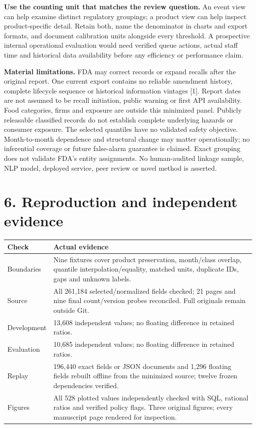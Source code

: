 \documentclass[10pt,letterpaper]{article}
\begin{document}
\textbf{Use the counting unit that matches the review question.} An event view can help examine distinct regulatory groupings; a product view can help inspect product-specific detail. Retain both, name the denominator in charts and export formats, and document calibration units alongside every threshold. A prospective internal operational evaluation would need verified queue actions, actual staff time and historical data availability before any efficiency or performance claim.

\textbf{Material limitations.} FDA may correct records or expand recalls after the original report. One current export contains no reliable amendment history, complete lifecycle sequence or historical information vintages [1]. Report dates are not assumed to be recall initiation, public warning or first API availability. Food categories, firms and exposure are outside this minimized panel. Publicly releasable classified records do not establish complete underlying hazards or consumer exposure. The selected quantiles have no validated safety objective. Month-to-month dependence and structural change may matter operationally; no inferential coverage or future false-alarm guarantee is claimed. Exact grouping does not validate FDA's entity assignments. No human-audited linkage sample, NLP model, deployed service, peer review or novel method is asserted.

\clearpage
\section*{6. Reproduction and independent evidence}
\begin{tabularx}{\linewidth}{lX}\toprule
Check & Actual evidence\\\midrule
Boundaries & Nine fixtures cover product preservation, month/class overlap, quantile interpolation/equality, matched units, duplicate IDs, gaps and unknown labels.\\
Source & All 261,184 selected/normalized fields checked; 21 pages and nine final count/version probes reconciled. Full originals remain outside Git.\\
Development & 13,608 independent values; no floating difference in retained ratios.\\
Evaluation & 10,685 independent values; no floating difference in retained ratios.\\
Replay & 196,440 exact fields or JSON documents and 1,296 floating fields rebuilt offline from the minimized source; twelve frozen dependencies verified.\\
Figures & All 528 plotted values independently checked with SQL, rational ratios and verified policy flags. Three original figures; every manuscript page rendered for inspection.\\\bottomrule
\end{tabularx}
\end{document}
